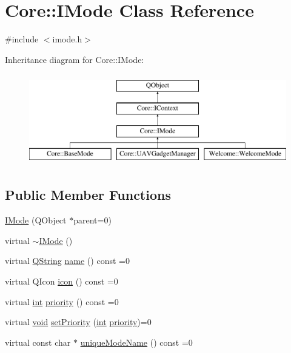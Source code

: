 \hypertarget{class_core_1_1_i_mode}{\section{Core\-:\-:I\-Mode Class Reference}
\label{class_core_1_1_i_mode}
}


{\ttfamily \#include $<$imode.\-h$>$}

Inheritance diagram for Core\-:\-:I\-Mode\-:\begin{figure}[H]
\begin{center}
\leavevmode
\includegraphics[height=4.000000cm]{class_core_1_1_i_mode}
\end{center}
\end{figure}
\subsection*{Public Member Functions}
\begin{DoxyCompactItemize}
\item 
\hyperlink{group___core_plugin_gaccbaa8bb681f8edbb321c1c05be26b9f}{I\-Mode} (Q\-Object $\ast$parent=0)
\item 
virtual \hyperlink{group___core_plugin_gae2b3ddcbc2ff1bd704871321bfd456b6}{$\sim$\-I\-Mode} ()
\item 
virtual \hyperlink{group___u_a_v_objects_plugin_gab9d252f49c333c94a72f97ce3105a32d}{Q\-String} \hyperlink{group___core_plugin_ga5892453cd69d59f044a66007256caa28}{name} () const =0
\item 
virtual Q\-Icon \hyperlink{group___core_plugin_ga08aee89ee18cb2f86fef5547c93eb324}{icon} () const =0
\item 
virtual \hyperlink{ioapi_8h_a787fa3cf048117ba7123753c1e74fcd6}{int} \hyperlink{group___core_plugin_gac22cc2ad63d314df4660f6345a7fff2c}{priority} () const =0
\item 
virtual \hyperlink{group___u_a_v_objects_plugin_ga444cf2ff3f0ecbe028adce838d373f5c}{void} \hyperlink{group___core_plugin_gab10108fb673e8128fb31d671a8a8db79}{set\-Priority} (\hyperlink{ioapi_8h_a787fa3cf048117ba7123753c1e74fcd6}{int} \hyperlink{group___core_plugin_gac22cc2ad63d314df4660f6345a7fff2c}{priority})=0
\item 
virtual const char $\ast$ \hyperlink{group___core_plugin_gab42870ab42d71194c7f6de4afe58fba5}{unique\-Mode\-Name} () const =0
\end{DoxyCompactItemize}


